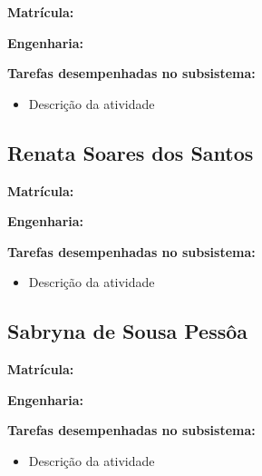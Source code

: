 \textbf{Matrícula:}

\textbf{Engenharia:}

\textbf{Tarefas desempenhadas no subsistema:}

\begin{itemize}
\item Descrição da atividade
\end{itemize}


\subsection{Renata Soares dos Santos}

\textbf{Matrícula:}

\textbf{Engenharia:}

\textbf{Tarefas desempenhadas no subsistema:}

\begin{itemize}
\item Descrição da atividade
\end{itemize}


\subsection{Sabryna de Sousa Pessôa}

\textbf{Matrícula:}

\textbf{Engenharia:}

\textbf{Tarefas desempenhadas no subsistema:}

\begin{itemize}
\item Descrição da atividade
\end{itemize}

